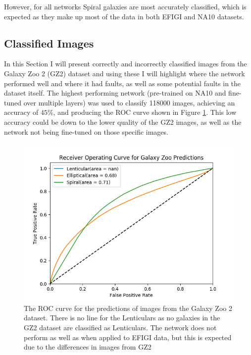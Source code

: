 \documentclass[12pt, onecolumn]{aa}
\begin{document}
However, for all networks Spiral galaxies are most accurately classified, which is expected as they make up most of the data in both EFIGI and NA10 datasets.

\subsection{Classified Images} \label{sec:classified_images}
In this Section I will present correctly and incorrectly classified images from the Galaxy Zoo 2 (GZ2) dataset and using these I will highlight where the network performed well and where it had faults, as well as some potential faults in the dataset itself. The highest performing network (pre-trained on NA10 and fine-tuned over multiple layers) was used to classify 118000 images, achieving an accuracy of $45\%$, and producing the ROC curve shown in Figure \ref{fig:gz_roccurve}. This low accuracy could be down to the lower quality of the GZ2 images, as well as the network not being fine-tuned on those specific images. \\
\begin{figure}[h]
    \centering
    \includegraphics[width=0.6\linewidth]{Figures/GZ_predictions.png}
    \caption{The ROC curve for the predictions of images from the Galaxy Zoo 2 dataset. There is no line for the Lenticulars as no galaxies in the GZ2 dataset are classified as Lenticulars. The network does not perform as well as when applied to EFIGI data, but this is expected due to the differences in images from GZ2}
    \label{fig:gz_roccurve}
\end{figure}
\end{document}
